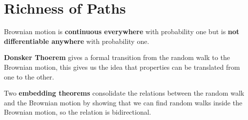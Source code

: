 \section{Richness of Paths}

Brownian motion is \textbf{continuous everywhere} with probability one but is \textbf{not differentiable anywhere} with probability one.

\textbf{Donsker Thoerem} gives a formal transition from the random walk to the Brownian motion,
this gives us the idea that properties can be translated from one to the other.

Two \textbf{embedding theorems} consolidate the relations between the random walk and the Brownian motion by showing that we can find random walks inside the Brownian motion,
so the relation is bidirectional.